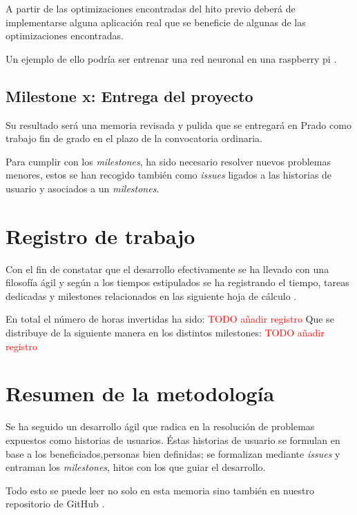 A partir de las optimizaciones encontradas del hito previo deberá de implementarse alguna aplicación real que se beneficie de algunas de las optimizaciones encontradas. 

Un ejemplo de ello podría ser entrenar una red neuronal en una raspberry pi .



\subsection*{Milestone x: Entrega del proyecto}

Su resultado será una memoria revisada y pulida que se entregará en Prado como trabajo fin de grado en el plazo de la convocatoria ordinaria. 

Para cumplir con los \textit{milestones},  ha sido necesario resolver nuevos  problemas menores, estos se han
recogido también como \textit{issues} ligados a las historias de usuario y asociados a un  \textit{milestones}.

\section{Registro de trabajo}  

Con el fin de constatar que el desarrollo efectivamente se ha 
llevado con una filosofía ágil y según a los tiempos estipulados se ha registrando el tiempo, tareas dedicadas  y milestones relacionados
en las siguiente hoja de cálculo \cite{TFG-hoja-calculo-horas-trabajo}.

En total el número de horas invertidas ha sido: 
\textcolor{red}{TODO añadir registro}
Que se distribuye de la siguiente manera en los distintos milestones: 
\textcolor{red}{TODO añadir registro}


\section{Resumen de la metodología}  

Se ha seguido un desarrollo ágil que radica en la resolución de problemas expuestos como historias de usuarios. 
Éstas historias de usuario se formulan en base a los beneficiados,personas bien definidas; se formalizan 
mediante \textit{issues} y entraman los \textit{milestones}, hitos con los que guiar el desarrollo.

Todo esto se puede leer no solo en esta memoria sino también en nuestro repositorio de GitHub \cite{TFG-Estudio-de-las-redes-neuronales}. 
 




